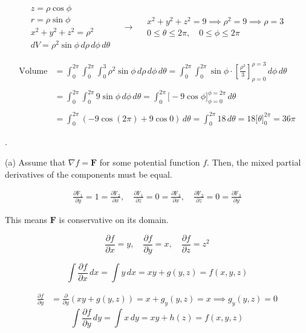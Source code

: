 \documentclass{article}
\begin{document}
\[
\begin{array}{c}
z=\rho\cos\phi\\
r=\rho\sin\phi\\
x^2+y^2+z^2=\rho^2\\
dV=\rho^2\sin\phi\,d\rho\,d\phi\,d\theta
\end{array}\quad\rightarrow\quad
\begin{array}{c}
x^2+y^2+z^2=9\implies\rho^2=9\implies\rho=3\\[1em]
0\leq\theta\leq2\pi,\quad0\leq\phi\leq2\pi
\end{array}
\]

\begin{align*}
\text{Volume}&=\int_0^{2\pi}\int_0^{2\pi}\int_0^{3}\rho^2\sin\phi\,d\rho\,d\phi\,d\theta=\int_0^{2\pi}\int_0^{2\pi}\sin\phi\cdot\left[\frac{\rho^3}3\right]_{\rho=0}^{\rho=3}\,d\phi\,d\theta\\\\&=\int_0^{2\pi}\int_0^{2\pi}9\sin\phi\,d\phi\,d\theta=\int_0^{2\pi}\bigg[-9\cos\phi\bigg]_{\phi=0}^{\phi=2\pi}\,d\theta\\\\&=\int_0^{2\pi}\left(-9\cos(2\pi)+9\cos0\right)\,d\theta=\int_0^{2\pi}18\,d\theta=18\bigg[\theta\bigg]_0^{2\pi}=\boxed{36\pi}
\end{align*}

.

\hfill

\noindent (a) Assume that $\nabla f=\mathbf{F}$ for some potential function $f$. Then, the mixed partial derivatives of the components must be equal.

\[
\begin{array}{c}
\displaystyle\frac{\partial\mathrm{F}_1}{\partial y}=1=\frac{\partial\mathrm{F}_2}{\partial x},\quad\frac{\partial\mathrm{F}_1}{\partial z}=0=\frac{\partial\mathrm{F}_3}{\partial x},\quad\frac{\partial\mathrm{F}_2}{\partial z}=0=\frac{\partial\mathrm{F}_3}{\partial y}
\end{array}
\]

\hfill

\noindent This means $\mathbf{F}$ is conservative on its domain.

\[\frac{\partial f}{\partial x}=y,\quad\frac{\partial f}{\partial y}=x,\quad\frac{\partial f}{\partial z}=z^2\]

\[\int\frac{\partial f}{\partial x}\,dx=\int y\,dx=xy+g(y,z)=f(x,y,z)\]

\begin{align*}\frac{\partial f}{\partial y}&=\frac{\partial}{\partial y}\left(xy+g(y,z)\right)=x+g_y(y,z)=x\implies g_y(y,z)=0\end{align*}
\[\int\frac{\partial f}{\partial y}\,dy=\int x\,dy=xy+h(z)=f(x,y,z)\]
\end{document}
